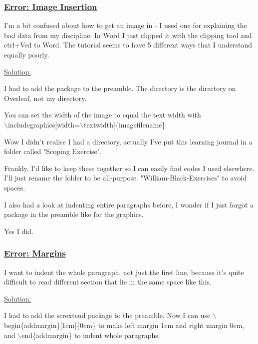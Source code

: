 \documentclass[12pt]{article}
\begin{document}
\subsubsection{\underline{Error: Image Insertion}}\label{error:er8}
\begin{addmargin}[1cm]{0cm}
I'm a bit confused about how to get an image in - I used one for explaining the bad data from my discipline. In Word I just clipped it with the clipping tool and ctrl+Ved to Word. The tutorial seems to have 5 different ways that I understand equally poorly.

\underline{Solution:}

I had to add the package to the preamble. The directory is the directory on Overleaf, not my directory.

You can set the width of the image to equal the text width with 
\\$\backslash$includegraphics[width=$\backslash$textwidth]\{imagefilename\}
\end{addmargin}

\vspace{0.5em}
Wow I didn't realise I had a directory, actually I've put this learning journal in a folder called "Scoping Exercise".

Frankly, I'd like to keep these together so I can easily find codes I used elsewhere. I'll just rename the folder to be all-purpose. "William-Black-Exercises" to avoid spaces.

I also had a look at indenting entire paragraphs before, I wonder if I just forgot a package in the preamble like for the graphics.

Yes I did.

\subsubsection{\underline{Error: Margins}}\label{error:er9}
\begin{addmargin}[1cm]{0cm}
I want to indent the whole paragraph, not just the first line, because it's quite difficult to read different section that lie in the same space like this.

\underline{Solution:}

I had to add the scrextend package to the preamble. Now I can use $\backslash$begin\{addmargin\}[1cm]\{0cm\} to make left margin 1cm and right margin 0cm, and $\backslash$end\{addmargin\} to indent whole paragraphs.

\end{addmargin}
\end{document}

